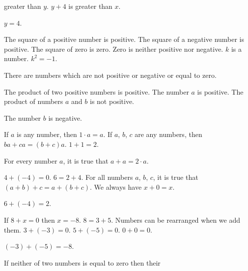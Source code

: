 \documentclass[11pt]{book}
\theoremstyle{bkplain}
\theoremstyle{XIplainnote}
\theoremstyle{bkplain}
\theoremstyle{bkplain}
\begin{document}
\begin{exercisecols}
\begin{exlist}
\begin{hyp}
      greater than $y$. $y + 4$ is greater than $x$.\end{hyp}
      \begin{thmclaim}$y = 4$.\end{thmclaim}
\item \begin{hyp}The square of a positive number is positive. The square of a
      negative number is positive. The square of zero is zero. Zero is neither
      positive nor negative. $k$ is a number. $k^2 = -1$.\end{hyp}
      \begin{thmclaim}There are numbers which are not positive or negative or
      equal to zero.\end{thmclaim}
\item \begin{hyp}The product of two positive numbers is positive. The number $a$
      is positive. The product of numbers $a$ and $b$ is not positive.\end{hyp}
      \begin{thmclaim}The number $b$ is negative.\end{thmclaim}
\item[\stex 16.] \begin{hyp}If $a$ is any number, then $1 \cdot a = a$. If $a$,
      $b$, $c$ are any numbers, then $ba + ca = (b + c)a$. $1 + 1 = 2$.\end{hyp}
      \begin{thmclaim}For every number $a$, it is true that $a + a = 2 \cdot
      a$.\end{thmclaim}
\item[\stex 17.] \begin{hyp}$4 + (-4) = 0$. $6 = 2 + 4$. For all numbers $a$, $b$,
      $c$, it is true that $(a + b) + c = a + (b + c)$. We always have $x + 0 =
      x$.\end{hyp}
      \begin{thmclaim}$6 + (-4) = 2$.\end{thmclaim}
\item[\stex 18.] \begin{hyp}If $8 + x = 0$ then $x = -8$. $8 = 3 + 5$. Numbers can
      be rearranged when we add them. $3 + (-3) = 0$. $5 + (-5) = 0$. $0 + 0 =
      0$.\end{hyp}
      \begin{thmclaim}$(-3) + (-5) = -8$.\end{thmclaim}
\item[\stex 19.] \begin{hyp}If neither of two numbers is equal to zero then their

\end{hyp}
\end{exlist}
\end{exercisecols}
\end{document}
